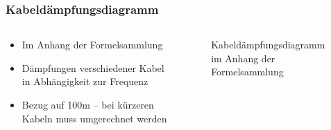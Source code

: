 \begin{frame}
\end{frame}

\begin{frame}
\frametitle{Kabeldämpfungsdiagramm}
\begin{columns}
    \begin{column}{0.48\textwidth}
    \begin{itemize}
  \item Im Anhang der Formelsammlung
  \item Dämpfungen verschiedener Kabel in Abhängigkeit zur Frequenz
  \item Bezug auf 100m -- bei kürzeren Kabeln muss umgerechnet werden
  \end{itemize}

    \end{column}
   \begin{column}{0.48\textwidth}
       
\begin{figure}
    \caption{\scriptsize Kabeldämpfungsdiagramm im Anhang der Formelsammlung}
    \label{e_kabeldaempfung_diagramm}
\end{figure}


   \end{column}
\end{columns}

\end{frame}


